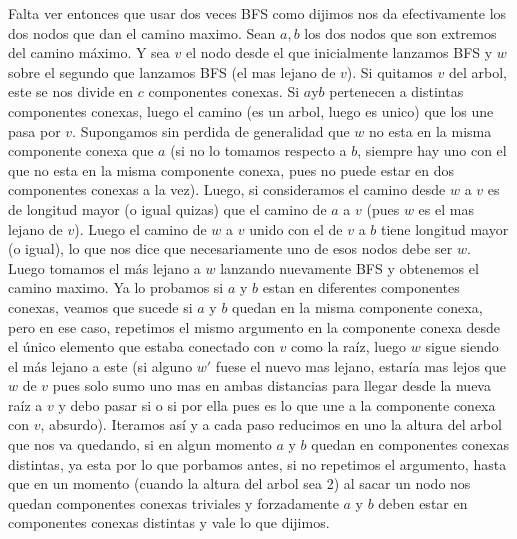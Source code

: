 \documentclass[A4paper,oneside,fleqn,11pt]{article}
\theoremstyle{definition}
\begin{document}
Falta ver entonces que usar dos veces BFS como dijimos nos da efectivamente los dos nodos que dan el camino maximo. Sean $a,b$ los dos nodos que son extremos del camino máximo. Y sea $v$ el nodo desde el que inicialmente lanzamos BFS y $w$ sobre el segundo que lanzamos BFS (el mas lejano de $v$). Si quitamos $v$ del arbol, este se nos divide en $c$ componentes conexas. Si $a $y$ b$ pertenecen a distintas componentes conexas, luego el camino (es un arbol, luego es unico) que los une pasa por $v$. Supongamos sin perdida de generalidad que $w$ no esta en la misma componente conexa que $a$ (si no lo tomamos respecto a $b$, siempre hay uno con el que no esta en la misma componente conexa, pues no puede estar en dos componentes conexas a la vez). Luego, si consideramos el camino desde $w$ a $v$ es de longitud mayor (o igual quizas) que el camino de $a$ a $v$ (pues $w$ es el mas lejano de $v$). Luego el camino de $w$ a $v$ unido con el de $v$ a $b$ tiene longitud mayor (o igual), lo que nos dice que necesariamente uno de esos nodos debe ser $w$. Luego tomamos el más lejano a $w$ lanzando nuevamente BFS y obtenemos el camino maximo. Ya lo probamos si $a$ y $b$ estan en diferentes componentes conexas, veamos que sucede si $a$ y $b$ quedan en la misma componente conexa, pero en ese caso, repetimos el mismo argumento en la componente conexa desde el único elemento que estaba conectado con $v$ como la raíz, luego $w$ sigue siendo el más lejano a este (si alguno $w'$ fuese el nuevo mas lejano, estaría mas lejos que $w$ de $v$ pues solo sumo uno mas en ambas distancias para llegar desde la nueva raíz a $v$ y debo pasar si o si por ella pues es lo que une a la componente conexa con $v$, absurdo). Iteramos así y a cada paso reducimos en uno la altura del arbol que nos va quedando, si en algun momento $a$ y $b$ quedan en componentes conexas distintas, ya esta por lo que porbamos antes, si no repetimos el argumento, hasta que en un momento (cuando la altura del arbol sea 2) al sacar un nodo nos quedan componentes conexas triviales y forzadamente $a$ y $b$ deben estar en componentes conexas distintas y vale lo que dijimos.
\end{document}
